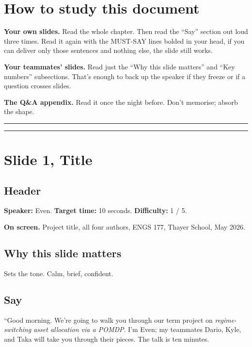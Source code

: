 \documentclass[11pt]{article}
\begin{document}
\section*{How to study this document}

\textbf{Your own slides.} Read the whole chapter. Then read the ``Say'' section out loud three times. Read it again with the MUST-SAY lines bolded in your head, if you can deliver only those sentences and nothing else, the slide still works.

\textbf{Your teammates' slides.} Read just the ``Why this slide matters'' and ``Key numbers'' subsections. That's enough to back up the speaker if they freeze or if a question crosses slides.

\textbf{The Q\&A appendix.} Read it once the night before. Don't memorise; absorb the shape.

\bigskip\hrule

\tableofcontents

\bigskip\hrule

\section*{Slide 1, Title}

\subsection*{Header}

\textbf{Speaker:} Even. \quad\textbf{Target time:} 10 seconds. \quad\textbf{Difficulty:} 1 / 5.

\textbf{On screen.} Project title, all four authors, ENGS 177, Thayer School, May 2026.

\subsection*{Why this slide matters}

Sets the tone. Calm, brief, confident.

\subsection*{Say}

``Good morning. We're going to walk you through our term project on \emph{regime-switching asset allocation via a POMDP}. I'm Even; my teammates Dario, Kyle, and Taka will take you through their pieces. The talk is ten minutes.
\end{document}
